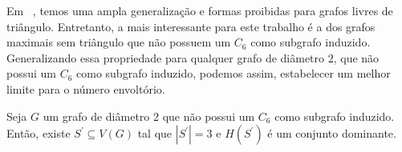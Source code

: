 Em ~\cite{Brandt2002a}, temos uma ampla generalização e formas proibidas para grafos livres de triângulo. Entretanto, a mais interessante para este trabalho é a dos grafos maximais sem triângulo que não possuem um $C_6$ como subgrafo induzido. Generalizando essa propriedade para qualquer grafo de diâmetro 2, 
que não possui um $C_6$ como subgrafo induzido, podemos assim, estabelecer um melhor limite para o número envoltório.

\begin{lemma}
\label{hs-dominante-mst}     
Seja $G$ um grafo de diâmetro 2 que não possui um $C_6$ como subgrafo induzido. Então, existe $S^\prime \subseteq V(G)$ tal que $|S^\prime|=3$ e $H(S^\prime)$ é um conjunto dominante.
\end{lemma}
